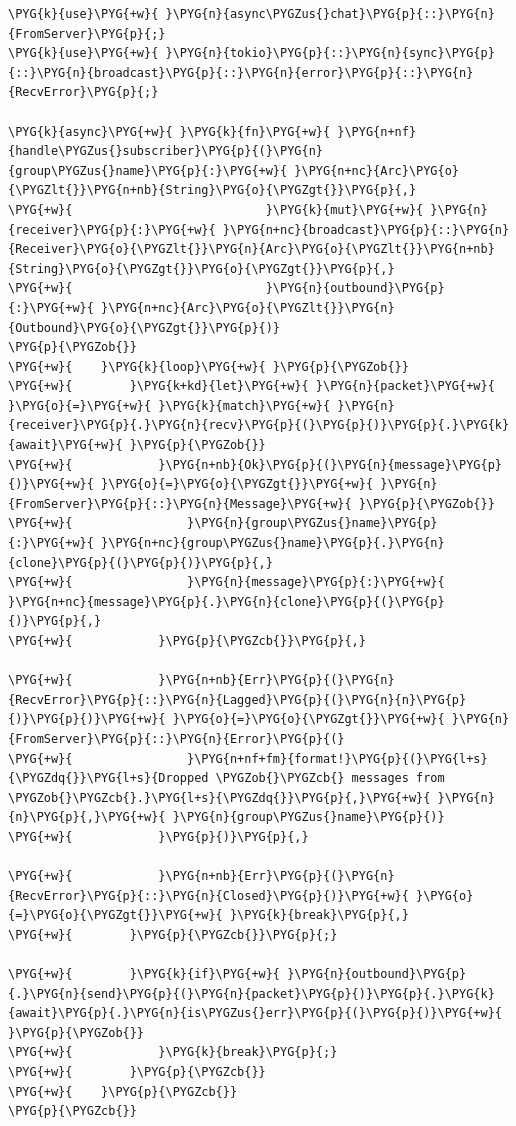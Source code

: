 \begin{Verbatim}[commandchars=\\\{\},breaklines=true,breakanywhere=true,fontsize=\codefont,xleftmargin=17bp]
\PYG{k}{use}\PYG{+w}{ }\PYG{n}{async\PYGZus{}chat}\PYG{p}{::}\PYG{n}{FromServer}\PYG{p}{;}
\PYG{k}{use}\PYG{+w}{ }\PYG{n}{tokio}\PYG{p}{::}\PYG{n}{sync}\PYG{p}{::}\PYG{n}{broadcast}\PYG{p}{::}\PYG{n}{error}\PYG{p}{::}\PYG{n}{RecvError}\PYG{p}{;}

\PYG{k}{async}\PYG{+w}{ }\PYG{k}{fn}\PYG{+w}{ }\PYG{n+nf}{handle\PYGZus{}subscriber}\PYG{p}{(}\PYG{n}{group\PYGZus{}name}\PYG{p}{:}\PYG{+w}{ }\PYG{n+nc}{Arc}\PYG{o}{\PYGZlt{}}\PYG{n+nb}{String}\PYG{o}{\PYGZgt{}}\PYG{p}{,}
\PYG{+w}{                           }\PYG{k}{mut}\PYG{+w}{ }\PYG{n}{receiver}\PYG{p}{:}\PYG{+w}{ }\PYG{n+nc}{broadcast}\PYG{p}{::}\PYG{n}{Receiver}\PYG{o}{\PYGZlt{}}\PYG{n}{Arc}\PYG{o}{\PYGZlt{}}\PYG{n+nb}{String}\PYG{o}{\PYGZgt{}}\PYG{o}{\PYGZgt{}}\PYG{p}{,}
\PYG{+w}{                           }\PYG{n}{outbound}\PYG{p}{:}\PYG{+w}{ }\PYG{n+nc}{Arc}\PYG{o}{\PYGZlt{}}\PYG{n}{Outbound}\PYG{o}{\PYGZgt{}}\PYG{p}{)}
\PYG{p}{\PYGZob{}}
\PYG{+w}{    }\PYG{k}{loop}\PYG{+w}{ }\PYG{p}{\PYGZob{}}
\PYG{+w}{        }\PYG{k+kd}{let}\PYG{+w}{ }\PYG{n}{packet}\PYG{+w}{ }\PYG{o}{=}\PYG{+w}{ }\PYG{k}{match}\PYG{+w}{ }\PYG{n}{receiver}\PYG{p}{.}\PYG{n}{recv}\PYG{p}{(}\PYG{p}{)}\PYG{p}{.}\PYG{k}{await}\PYG{+w}{ }\PYG{p}{\PYGZob{}}
\PYG{+w}{            }\PYG{n+nb}{Ok}\PYG{p}{(}\PYG{n}{message}\PYG{p}{)}\PYG{+w}{ }\PYG{o}{=}\PYG{o}{\PYGZgt{}}\PYG{+w}{ }\PYG{n}{FromServer}\PYG{p}{::}\PYG{n}{Message}\PYG{+w}{ }\PYG{p}{\PYGZob{}}
\PYG{+w}{                }\PYG{n}{group\PYGZus{}name}\PYG{p}{:}\PYG{+w}{ }\PYG{n+nc}{group\PYGZus{}name}\PYG{p}{.}\PYG{n}{clone}\PYG{p}{(}\PYG{p}{)}\PYG{p}{,}
\PYG{+w}{                }\PYG{n}{message}\PYG{p}{:}\PYG{+w}{ }\PYG{n+nc}{message}\PYG{p}{.}\PYG{n}{clone}\PYG{p}{(}\PYG{p}{)}\PYG{p}{,}
\PYG{+w}{            }\PYG{p}{\PYGZcb{}}\PYG{p}{,}

\PYG{+w}{            }\PYG{n+nb}{Err}\PYG{p}{(}\PYG{n}{RecvError}\PYG{p}{::}\PYG{n}{Lagged}\PYG{p}{(}\PYG{n}{n}\PYG{p}{)}\PYG{p}{)}\PYG{+w}{ }\PYG{o}{=}\PYG{o}{\PYGZgt{}}\PYG{+w}{ }\PYG{n}{FromServer}\PYG{p}{::}\PYG{n}{Error}\PYG{p}{(}
\PYG{+w}{                }\PYG{n+nf+fm}{format!}\PYG{p}{(}\PYG{l+s}{\PYGZdq{}}\PYG{l+s}{Dropped \PYGZob{}\PYGZcb{} messages from \PYGZob{}\PYGZcb{}.}\PYG{l+s}{\PYGZdq{}}\PYG{p}{,}\PYG{+w}{ }\PYG{n}{n}\PYG{p}{,}\PYG{+w}{ }\PYG{n}{group\PYGZus{}name}\PYG{p}{)}
\PYG{+w}{            }\PYG{p}{)}\PYG{p}{,}

\PYG{+w}{            }\PYG{n+nb}{Err}\PYG{p}{(}\PYG{n}{RecvError}\PYG{p}{::}\PYG{n}{Closed}\PYG{p}{)}\PYG{+w}{ }\PYG{o}{=}\PYG{o}{\PYGZgt{}}\PYG{+w}{ }\PYG{k}{break}\PYG{p}{,}
\PYG{+w}{        }\PYG{p}{\PYGZcb{}}\PYG{p}{;}

\PYG{+w}{        }\PYG{k}{if}\PYG{+w}{ }\PYG{n}{outbound}\PYG{p}{.}\PYG{n}{send}\PYG{p}{(}\PYG{n}{packet}\PYG{p}{)}\PYG{p}{.}\PYG{k}{await}\PYG{p}{.}\PYG{n}{is\PYGZus{}err}\PYG{p}{(}\PYG{p}{)}\PYG{+w}{ }\PYG{p}{\PYGZob{}}
\PYG{+w}{            }\PYG{k}{break}\PYG{p}{;}
\PYG{+w}{        }\PYG{p}{\PYGZcb{}}
\PYG{+w}{    }\PYG{p}{\PYGZcb{}}
\PYG{p}{\PYGZcb{}}
\end{Verbatim}

